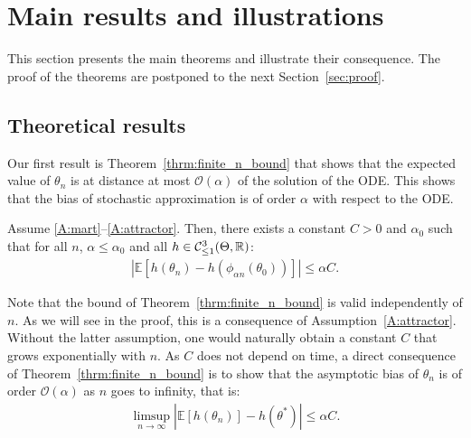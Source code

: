 \documentclass{article}
\newcommand{\R}{\mathbb{R}}
\newcommand\E{\mathbb{E}}
\newcommand\esp[1]{\E\left[#1\right]}
\newcommand\abs[1]{\left|#1\right|}
\newcommand\bO[1]{\mathcal{O}(#1)}
\newcommand\cont[3][]{\mathcal{C}^{#2}_{\ifthenelse{\equal{#1}{all}}{}{\le1}}(#3,\R)}
\begin{document}
\section{Main results and illustrations}
\label{sec:main-results}

This section presents the main theorems and illustrate their consequence. The proof of the theorems are postponed to the next Section~\ref{sec:proof}.

\subsection{Theoretical results}

Our first result is Theorem~\ref{thrm:finite_n_bound} that shows that the expected value of $\theta_n$ is at distance at most $\bO{\alpha}$ of the solution of the ODE. This shows that the bias of stochastic approximation is of order $\alpha$ with respect to the ODE.

\begin{theorem} \label{thrm:finite_n_bound}
    Assume \ref{A:mart}--\ref{A:attractor}. Then, there exists a constant $C>0$ and $\alpha_0$ such that for all $n$, $\alpha\le\alpha_0$ and all $h\in\cont{3}{\Theta}$:
    \begin{align*}
        \abs{\esp{h(\theta_n) - h(\phi_{\alpha n}(\theta_0))} } \leq \alpha C.
    \end{align*}
\end{theorem}
Note that the bound of Theorem~\ref{thrm:finite_n_bound} is valid independently of $n$. As we will see in the proof, this is a consequence of Assumption~\ref{A:attractor}. Without the latter assumption, one would naturally obtain a constant $C$ that grows exponentially with $n$. As $C$ does not depend on time, a direct consequence of Theorem~\ref{thrm:finite_n_bound} is to show that the asymptotic bias of $\theta_n$ is of order $\bO{\alpha}$ as $n$ goes to infinity, that is:
\begin{align}
    \label{eq:bias_bound}
    \limsup_{n\to\infty}\abs{\esp{h(\theta_n)} - h(\theta^*)} \leq \alpha C.
\end{align}
\end{document}
